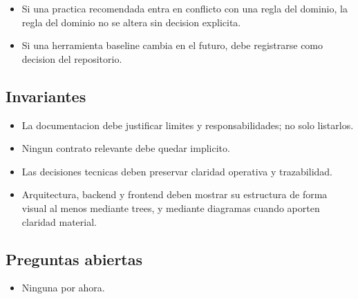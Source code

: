 \begin{itemize}
  \item Si una practica recomendada entra en conflicto con una regla del dominio, la regla del dominio no se altera sin decision explicita.
  \item Si una herramienta baseline cambia en el futuro, debe registrarse como decision del repositorio.
\end{itemize}

\subsection{Invariantes}

\begin{itemize}
  \item La documentacion debe justificar limites y responsabilidades; no solo listarlos.
  \item Ningun contrato relevante debe quedar implicito.
  \item Las decisiones tecnicas deben preservar claridad operativa y trazabilidad.
  \item Arquitectura, backend y frontend deben mostrar su estructura de forma visual al menos mediante trees, y mediante diagramas cuando aporten claridad material.
\end{itemize}

\subsection{Preguntas abiertas}

\begin{itemize}
  \item Ninguna por ahora.
\end{itemize}
